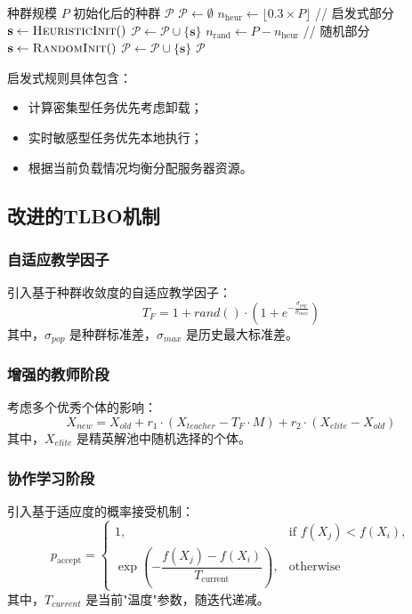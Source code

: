 \documentclass[conference]{IEEEtran}
\begin{document}
\begin{algorithm}
  \caption{智能初始化策略}
  \label{alg:intelligent_init}
  \begin{algorithmic}[1]        %
    \REQUIRE 种群规模 $P$
    \ENSURE 初始化后的种群 $\mathcal{P}$
    \STATE $\mathcal{P} \leftarrow \emptyset$
    \STATE $n_{\mathrm{heur}} \leftarrow \lfloor 0.3 \times P \rfloor$  \hfill// 启发式部分
        \STATE $\mathbf{s} \leftarrow \textsc{HeuristicInit}()$
        \STATE $\mathcal{P} \leftarrow \mathcal{P} \cup \{\mathbf{s}\}$
    \ENDFOR
    \STATE $n_{\mathrm{rand}} \leftarrow P - n_{\mathrm{heur}}$        \hfill// 随机部分
        \STATE $\mathbf{s} \leftarrow \textsc{RandomInit}()$
        \STATE $\mathcal{P} \leftarrow \mathcal{P} \cup \{\mathbf{s}\}$
    \ENDFOR
    \RETURN $\mathcal{P}$
  \end{algorithmic}
\end{algorithm}
启发式规则具体包含：
\begin{itemize}
  \item 计算密集型任务优先考虑卸载；
  \item 实时敏感型任务优先本地执行；
  \item 根据当前负载情况均衡分配服务器资源。
\end{itemize}
\subsection{改进的TLBO机制}
\subsubsection{自适应教学因子}
引入基于种群收敛度的自适应教学因子：
\begin{equation}
T_F = 1 + rand() \cdot \left(1 + e^{-\frac{\sigma_{pop}}{\sigma_{max}}}\right)
\end{equation}
其中，$\sigma_{pop}$ 是种群标准差，$\sigma_{max}$ 是历史最大标准差。
\subsubsection{增强的教师阶段}
考虑多个优秀个体的影响：
\begin{equation}
X_{new} = X_{old} + r_1 \cdot (X_{teacher} - T_F \cdot M) + r_2 \cdot (X_{elite} - X_{old})
\end{equation}
其中，$X_{elite}$ 是精英解池中随机选择的个体。
\subsubsection{协作学习阶段}
引入基于适应度的概率接受机制：
\begin{equation}
p_{\text{accept}} =
\begin{cases}
1, &
\text{if } f(X_j) < f(X_i),\\[4pt]
\displaystyle
\exp\!\left( -\dfrac{f(X_j) - f(X_i)}{T_{\text{current}}} \right), &
\text{otherwise}
\end{cases}
\end{equation}
其中，$T_{current}$ 是当前"温度"参数，随迭代递减。
\end{document}
